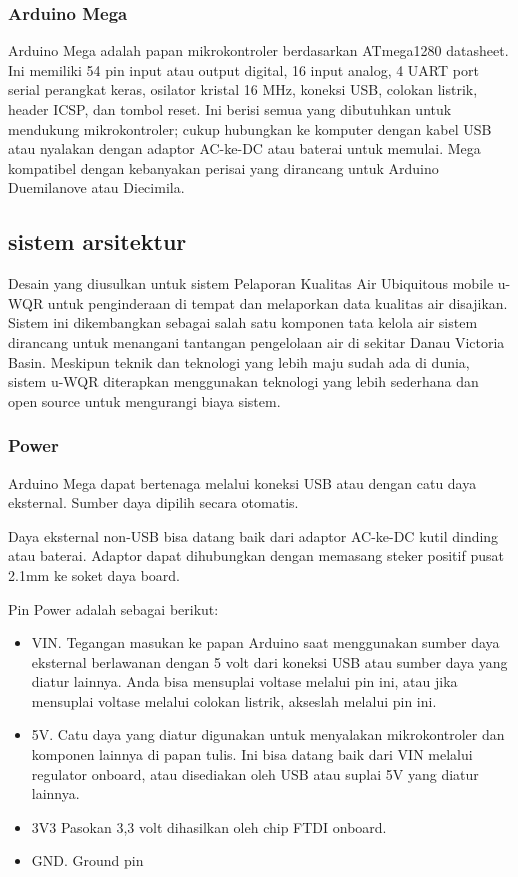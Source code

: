 \subsubsection{Arduino Mega}
Arduino Mega adalah papan mikrokontroler berdasarkan ATmega1280 datasheet. Ini memiliki 54 pin input atau output digital, 16 input analog, 4 UART port serial perangkat keras, osilator kristal 16 MHz, koneksi USB, colokan listrik, header ICSP, dan tombol reset. Ini berisi semua yang dibutuhkan untuk mendukung mikrokontroler; cukup hubungkan ke komputer dengan kabel USB atau nyalakan dengan adaptor AC-ke-DC atau baterai untuk memulai. Mega kompatibel dengan kebanyakan perisai yang dirancang untuk Arduino Duemilanove atau Diecimila.

\subsection{sistem arsitektur}
Desain yang diusulkan untuk sistem Pelaporan Kualitas Air Ubiquitous mobile u-WQR untuk penginderaan di tempat
dan melaporkan data kualitas air disajikan. Sistem ini dikembangkan sebagai salah satu komponen tata kelola air
sistem dirancang untuk menangani tantangan pengelolaan air di sekitar Danau Victoria Basin.
Meskipun teknik dan teknologi yang lebih maju sudah ada di dunia, sistem u-WQR diterapkan
menggunakan teknologi yang lebih sederhana dan open source untuk mengurangi biaya sistem.

\subsubsection{Power}
Arduino Mega dapat bertenaga melalui koneksi USB atau dengan catu daya eksternal. Sumber daya dipilih secara otomatis.

Daya eksternal non-USB bisa datang baik dari adaptor AC-ke-DC kutil dinding atau baterai. Adaptor dapat dihubungkan dengan memasang steker positif pusat 2.1mm ke soket daya board.

Pin Power adalah sebagai berikut:
\begin{itemize}
\item VIN. Tegangan masukan ke papan Arduino saat menggunakan sumber daya eksternal berlawanan dengan 5 volt dari koneksi USB atau sumber daya yang diatur lainnya. Anda bisa mensuplai voltase melalui pin ini, atau jika mensuplai voltase melalui colokan listrik, akseslah melalui pin ini.
\item 5V. Catu daya yang diatur digunakan untuk menyalakan mikrokontroler dan komponen lainnya di papan tulis. Ini bisa datang baik dari VIN melalui regulator onboard, atau disediakan oleh USB atau suplai 5V yang diatur lainnya.
\item 3V3 Pasokan 3,3 volt dihasilkan oleh chip FTDI onboard.
\item GND. Ground pin
\end{itemize}


